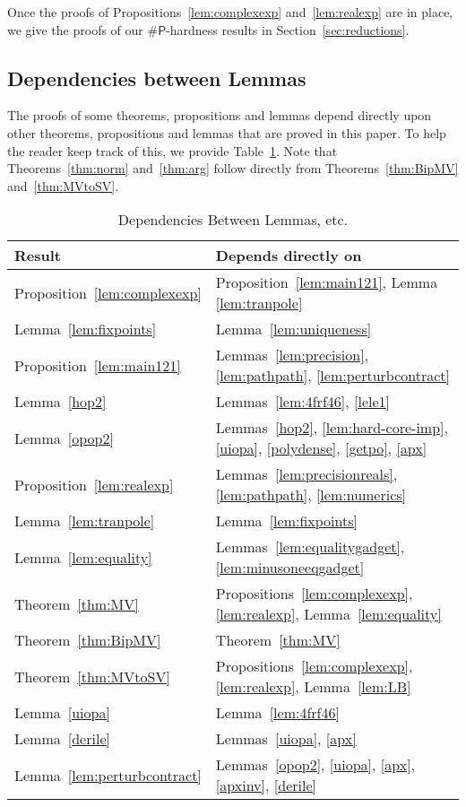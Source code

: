 \documentclass[11pt]{article}
\def\numP{\#\mathsf{P}}
\begin{document}
Once the proofs of Propositions~\ref{lem:complexexp} and~\ref{lem:realexp} are in place, we give the proofs of our $\numP$-hardness results in Section~\ref{sec:reductions}.


\subsection{Dependencies between Lemmas}

The proofs of some theorems, propositions and lemmas   depend directly upon other
theorems, propositions and lemmas that are proved in this paper.
To help the reader keep track of this, we provide Table~\ref{table:dep}.
Note that Theorems~\ref{thm:norm} and~\ref{thm:arg} follow directly from Theorems~\ref{thm:BipMV} and~\ref{thm:MVtoSV}.

\begin{table}[h]
\caption{Dependencies Between Lemmas, etc.}
\centering
\begin{tabular}{| l | l |}
\hline\hline
Result & Depends directly on \\
\hline
\hline
Proposition~\ref{lem:complexexp} & Proposition~\ref{lem:main121}, Lemma \ref{lem:tranpole}\\ \hline
Lemma~\ref{lem:fixpoints} & Lemma~\ref{lem:uniqueness}\\ \hline
Proposition~\ref{lem:main121} & Lemmas~\ref{lem:precision}, \ref{lem:pathpath}, \ref{lem:perturbcontract}\\ \hline
Lemma~\ref{hop2} & Lemmas~\ref{lem:4frf46}, \ref{lele1}\\ \hline
Lemma~\ref{opop2} & Lemmas~\ref{hop2}, \ref{lem:hard-core-imp}, \ref{uiopa}, \ref{polydense}, \ref{getpo}, \ref{apx}\\ \hline
Proposition~\ref{lem:realexp} & Lemmas~\ref{lem:precisionreals},  \ref{lem:pathpath}, \ref{lem:numerics} \\ \hline
Lemma~\ref{lem:tranpole} & Lemma~\ref{lem:fixpoints} \\ \hline
Lemma~\ref{lem:equality} & Lemmas~\ref{lem:equalitygadget}, \ref{lem:minusoneeqgadget} \\ \hline
Theorem~\ref{thm:MV} & Propositions~\ref{lem:complexexp}, \ref{lem:realexp}, Lemma~\ref{lem:equality} \\ \hline
Theorem~\ref{thm:BipMV} & Theorem~\ref{thm:MV} \\ \hline
Theorem~\ref{thm:MVtoSV} & Propositions~\ref{lem:complexexp}, \ref{lem:realexp}, Lemma~\ref{lem:LB} \\ \hline
Lemma~\ref{uiopa} & Lemma~\ref{lem:4frf46} \\ \hline
Lemma~\ref{derile} & Lemmas~\ref{uiopa}, \ref{apx} \\ \hline
Lemma~\ref{lem:perturbcontract} & Lemmas~\ref{opop2}, \ref{uiopa},  \ref{apx}, \ref{apxinv}, \ref{derile} \\
\hline
\hline
\end{tabular}
\label{table:dep}
\end{table}
\end{document}
